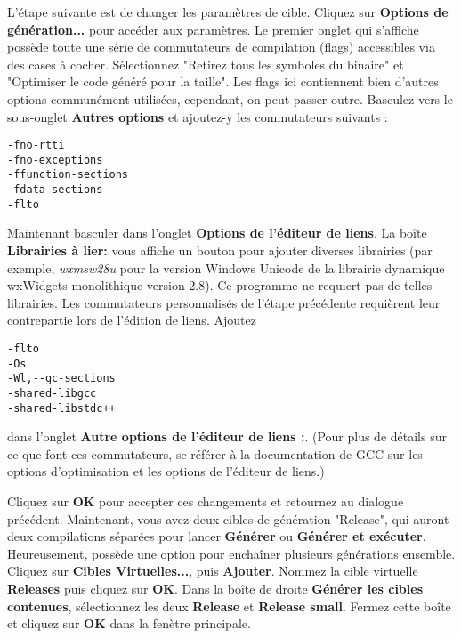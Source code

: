 
L'étape suivante est de changer les paramètres de cible. Cliquez sur \textbf{Options de génération...} pour accéder aux paramètres. Le premier onglet qui s'affiche possède toute une série de commutateurs de compilation (flags) accessibles via des cases à cocher. Sélectionnez "Retirez tous les symboles du binaire" et "Optimiser le code généré pour la taille". Les flags ici contiennent bien d'autres options communément utilisées, cependant, on peut passer outre. Basculez vers le sous-onglet \textbf{Autres options} et ajoutez-y les commutateurs suivants :

\begin{lstlisting}
-fno-rtti
-fno-exceptions
-ffunction-sections
-fdata-sections
-flto
\end{lstlisting}

Maintenant basculer dans l'onglet \textbf{Options de l'éditeur de liens}. La boîte \textbf{Librairies à lier:} vous affiche un bouton pour ajouter diverses librairies (par exemple, \textit{wxmsw28u} pour la version Windows Unicode de la librairie dynamique wxWidgets monolithique version 2.8). Ce programme ne requiert pas de telles librairies. Les  commutateurs personnalisés de l'étape précédente requièrent leur contrepartie lors de l'édition de liens. Ajoutez

\begin{lstlisting}
-flto
-Os
-Wl,--gc-sections
-shared-libgcc
-shared-libstdc++
\end{lstlisting}

dans l'onglet \textbf{Autre options de l'éditeur de liens :}. (Pour plus de détails sur ce que font ces commutateurs, se référer à la documentation de GCC sur les options d'optimisation et les options de l'éditeur de liens.)


Cliquez sur \textbf{OK} pour accepter ces changements et retournez au dialogue précédent. Maintenant, vous avez deux cibles de génération "Release", qui auront deux compilations séparées pour lancer \textbf{Générer} ou \textbf{Générer et exécuter}. Heureusement, \codeblocks possède une option pour enchaîner plusieurs générations ensemble. Cliquez sur \textbf{Cibles Virtuelles...}, puis \textbf{Ajouter}. Nommez la cible virtuelle \textbf{Releases} puis cliquez sur \textbf{OK}. Dans la boîte de droite \textbf{Générer les cibles contenues}, sélectionnez les deux \textbf{Release} et \textbf{Release small}. Fermez cette boîte et cliquez sur \textbf{OK} dans la fenètre principale. 

